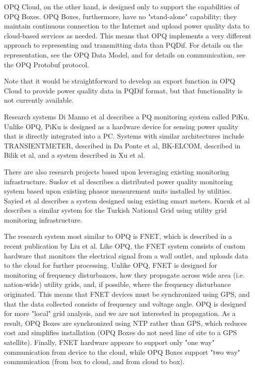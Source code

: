 OPQ Cloud, on the other hand, is designed only to support the capabilities of OPQ Boxes. OPQ Boxes, furthermore, have no "stand-alone" capability; they maintain continuous connection to the Internet and upload power quality data to cloud-based services as needed. This means that OPQ implements a very different approach to representing and transmitting data than PQDif. For details on the representation, see the OPQ Data Model, and for details on communication, see the OPQ Protobuf protocol.

Note that it would be straightforward to develop an export function in OPQ Cloud to provide power quality data in PQDif format, but that functionality is not currently available.

Research systems
Di Manno et al describes a PQ monitoring system called PiKu. Unlike OPQ, PiKu is designed as a hardware device for sensing power quality that is directly integrated into a PC. Systems with similar architectures include TRANSIENTMETER, described in Da Ponte et al, BK-ELCOM, described in Bilik et al, and a system described in Xu et al.

There are also research projects based upon leveraging existing monitoring infrastructure. Suslov et al describes a distributed power quality monitoring system based upon existing phasor measurement units installed by utilities. Sayied et al describes a system designed using existing smart meters. Kucuk et al describes a similar system for the Turkish National Grid using utility grid monitoring infrastructure.

The research system most similar to OPQ is FNET, which is described in a recent publication by Liu et al. Like OPQ, the FNET system consists of custom hardware that monitors the electrical signal from a wall outlet, and uploads data to the cloud for further processing. Unlike OPQ, FNET is designed for monitoring of frequency disturbances, how they propagate across wide area (i.e. nation-wide) utility grids, and, if possible, where the frequency disturbance originated. This means that FNET devices must be synchronized using GPS, and that the data collected consists of frequency and voltage angle. OPQ is designed for more "local" grid analysis, and we are not interested in propagation. As a result, OPQ Boxes are synchronized using NTP rather than GPS, which reduces cost and simplifies installation (OPQ Boxes do not need line of site to a GPS satellite). Finally, FNET hardware appears to support only "one way" communication from device to the cloud, while OPQ Boxes support "two way" communication (from box to cloud, and from cloud to box).